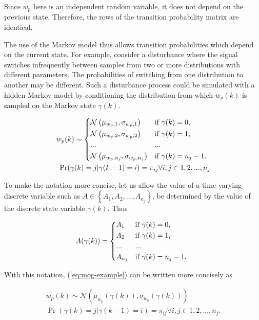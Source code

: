 Since $w_{p}$ here is an independent random variable, it does not depend on the previous state. Therefore, the rows of the transition probability matrix are identical. 

The use of the Markov model thus allows transition probabilities which depend on the current state. For example, consider a disturbance where the signal switches infrequently between samples from two or more distributions with different parameters. The probabilities of switching from one distribution to another may be different. Such a disturbance process could be simulated with a hidden Markov model by conditioning the distribution from which $w_p(k)$ is sampled on the Markov state $\gamma(k)$.

\begin{equation} \label{eq:mog-example}
	\begin{split}
		w_p(k) \sim 
		\begin{cases*}
			\mathcal{N}\left(\mu_{w_p,1}, \sigma_{w_p,1}\right) & if $\gamma(k)=0$, \\
			\mathcal{N}\left(\mu_{w_p,2}, \sigma_{w_p,2}\right) & if $\gamma(k)=1$, \\
			... & ...\\
			\mathcal{N}\left(\mu_{w_p,n_j}, \sigma_{w_p,n_j}\right) & if $\gamma(k)=n_j-1$.
		\end{cases*} \\
	\Pr(\gamma(k)=j|\gamma(k-1)=i)=\pi_{ij} \forall i,j \in {1,2,...,n_j}
	\end{split}
\end{equation}

To make the notation more concise, let us allow the value of a time-varying discrete variable such as $A\in\left\{A_1,A_2,...,A_{n_j}\right\}$, be determined by the value of the discrete state variable $\gamma(k)$. Thus

\begin{equation} \label{eq:A-selection}
	A(\gamma(k)) = 
	\begin{cases*}
		A_1 & if $\gamma(k)=0$, \\
		A_2 & if $\gamma(k)=1$, \\
		... & ...\\
		A_{n_j} & if $\gamma(k)=n_j-1$.
	\end{cases*}
\end{equation}


With this notation, (\ref{eq:mog-example}) can be written more concisely as

\begin{equation} \label{eq:mog-example2}
	\begin{split}
		w_p(k) \sim \mathcal{N}\left(\mu_{w_p}(\gamma(k)), \sigma_{w_p}(\gamma(k))\right) \\
		\Pr(\gamma(k)=j|\gamma(k-1)=i)=\pi_{ij} \forall i,j \in {1,2,...,n_j}.
	\end{split}
\end{equation}

